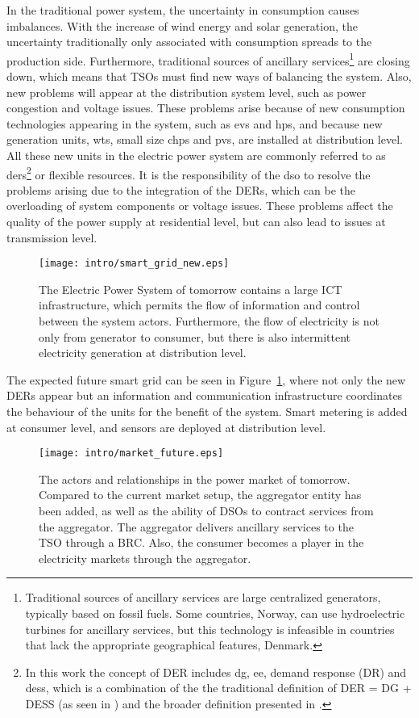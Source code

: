 In the traditional power system, the uncertainty in consumption causes imbalances. With the increase of wind energy and solar generation, the uncertainty traditionally only associated with consumption spreads to the production side. Furthermore, traditional sources of ancillary services\footnote{Traditional sources of ancillary services are large centralized generators, typically based on fossil fuels. Some countries, \eg Norway, can use hydroelectric turbines for ancillary services, but this technology is infeasible in countries that lack the appropriate geographical features, \eg Denmark.} are closing down, which means that TSOs must find new ways of balancing the system. Also, new problems will appear at the distribution system level, such as power congestion and voltage issues. These problems arise because of new consumption technologies appearing in the system, such as \glspl{ev} and \glspl{hp}, and because new generation units, \eg \glspl{wt}, small size \glspl{chp} and \glspl{pv}, are installed at distribution level. All these new units in the electric power system are commonly referred to as \glspl{der}\footnote{In this work the concept of DER includes \gls{dg}, \gls{ee}, demand response (DR) and \gls{dess}, which is a combination of the the traditional definition of DER = DG + DESS (as seen in \eg \cite{nrel2002using}) and the broader definition presented in \cite{nys2014reforming}.} or flexible resources. It is the responsibility of the \gls{dso} to resolve the problems arising due to the integration of the DERs, which can be the overloading of system components or voltage issues. These problems affect the quality of the power supply at residential level, but can also lead to issues at transmission level.
\begin{figure}[ht]
	\centering
	\caption{The Electric Power System of tomorrow contains a large ICT infrastructure, which permits the flow of information and control between the system actors. Furthermore, the flow of electricity is not only from generator to consumer, but there is also intermittent electricity generation at distribution level.}
	\texttt{[image: intro/smart\_grid\_new.eps]}\label{fig:powerfuture}
\end{figure}

The expected future smart grid can be seen in Figure~\ref{fig:powerfuture}, where not only the new DERs appear but an information and communication infrastructure coordinates the behaviour of the units for the benefit of the system. Smart metering is added at consumer level, and sensors are deployed at distribution level.
\begin{figure*}[htbp!]
	\centering
	\caption{The actors and relationships in the power market of tomorrow. Compared to the current market setup, the aggregator entity has been added, as well as the ability of DSOs to contract services from the aggregator. The aggregator delivers ancillary services to the TSO through a BRC. Also, the consumer becomes a player in the electricity markets through the aggregator.}
	\texttt{[image: intro/market\_future.eps]}\label{fig:marketfuture}
\end{figure*}

